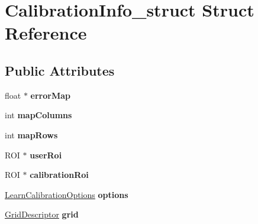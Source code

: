 \hypertarget{structCalibrationInfo__struct}{
\section{CalibrationInfo\_\-struct Struct Reference}
\label{structCalibrationInfo__struct}
}
\subsection*{Public Attributes}
\begin{DoxyCompactItemize}
\item 
\hypertarget{structCalibrationInfo__struct_a5b30969974ee91bf9a346b4860408577}{
float $\ast$ {\bfseries errorMap}}
\label{structCalibrationInfo__struct_a5b30969974ee91bf9a346b4860408577}

\item 
\hypertarget{structCalibrationInfo__struct_ab56f6922d5a7c65e04ee97139048023e}{
int {\bfseries mapColumns}}
\label{structCalibrationInfo__struct_ab56f6922d5a7c65e04ee97139048023e}

\item 
\hypertarget{structCalibrationInfo__struct_a45b60263ee43957bb10e9ac35e2e7e6f}{
int {\bfseries mapRows}}
\label{structCalibrationInfo__struct_a45b60263ee43957bb10e9ac35e2e7e6f}

\item 
\hypertarget{structCalibrationInfo__struct_ae2bd8cfbf68035154be679104871ae7a}{
ROI $\ast$ {\bfseries userRoi}}
\label{structCalibrationInfo__struct_ae2bd8cfbf68035154be679104871ae7a}

\item 
\hypertarget{structCalibrationInfo__struct_ae27c6fd8f374b22643606c3d2e65d1d8}{
ROI $\ast$ {\bfseries calibrationRoi}}
\label{structCalibrationInfo__struct_ae27c6fd8f374b22643606c3d2e65d1d8}

\item 
\hypertarget{structCalibrationInfo__struct_ad02d1a36cd112999d61bfc1392792090}{
\hyperlink{structLearnCalibrationOptions__struct}{LearnCalibrationOptions} {\bfseries options}}
\label{structCalibrationInfo__struct_ad02d1a36cd112999d61bfc1392792090}

\item 
\hypertarget{structCalibrationInfo__struct_add7b10d7a280e674c885bb525ede1e98}{
\hyperlink{structGridDescriptor__struct}{GridDescriptor} {\bfseries grid}}
\label{structCalibrationInfo__struct_add7b10d7a280e674c885bb525ede1e98}


\end{DoxyCompactItemize}
